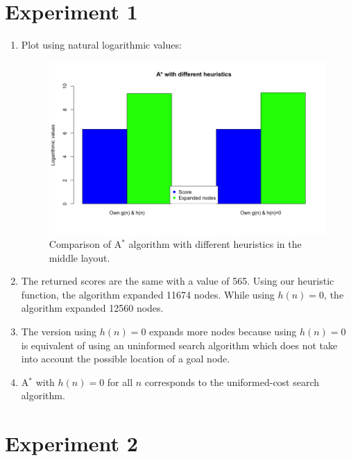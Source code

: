 \documentclass{article}
\begin{document}
\section{Experiment 1}

\begin{enumerate}[label=\alph*.,leftmargin=1.35em]
    \item Plot using natural logarithmic values:\\
    \begin{figure}[H]
        \centering
        \includegraphics[scale=0.5]{q3_plot.png} 
        \caption{Comparison of A$^*$ algorithm with different heuristics in the middle layout.}
    \end{figure}
    \item The returned scores are the same with a value of 565. Using our heuristic function, the algorithm expanded 11674 nodes. While using $h(n)=0$, the algorithm expanded 12560 nodes.
    \item The version using $h(n) = 0$ expands more nodes because using $h(n) = 0$ is equivalent of using an uninformed search algorithm which does not take into account the possible location of a goal node.
    \item A$^*$ with $h(n) = 0$ for all $n$ corresponds to the uniformed-cost search algorithm.
\end{enumerate}

\section{Experiment 2}
\end{document}
